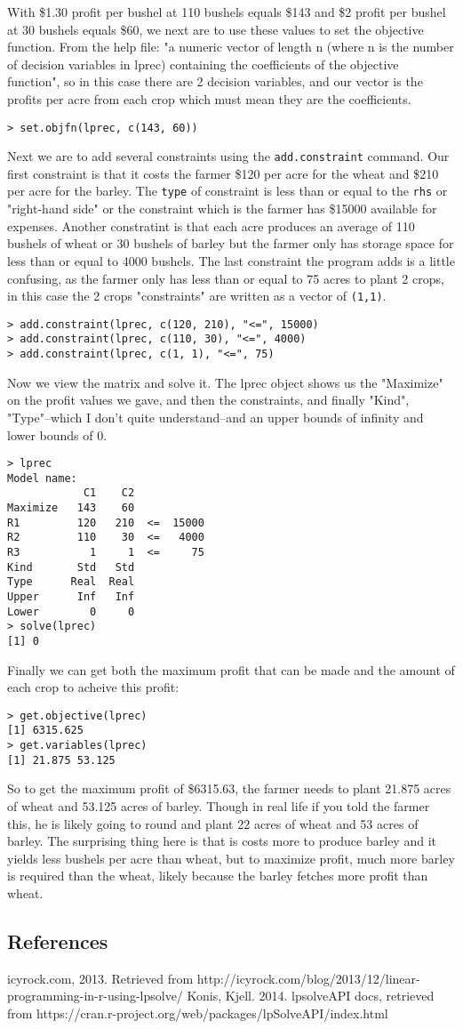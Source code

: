 \documentclass[10pt]{article}
\begin{document}
With \$1.30 profit per bushel at 110 bushels equals \$143 and \$2 profit per bushel at 30 bushels equals \$60, we next are to use these values to set the objective function. From the help file: "a numeric vector of length n (where n is the number of decision variables in lprec) containing the coefficients of the objective function", so in this case there are 2 decision variables, and our vector is the profits per acre from each crop which must mean they are the coefficients. 
\begin{verbatim}
> set.objfn(lprec, c(143, 60))
\end{verbatim}
Next we are to add several constraints using the \verb|add.constraint| command. Our first constraint is that it costs the farmer \$120 per acre for the wheat and \$210 per acre for the barley. The \verb|type| of constraint is less than or equal to the \verb|rhs| or "right-hand side" or the constraint which is the farmer has \$15000 available for expenses. Another constratint is that each acre produces an average of 110 bushels of wheat or 30 bushels of barley but the farmer only has storage space for less than or equal to 4000 bushels. The last constraint the program adds is a little confusing, as the farmer only has less than or equal to 75 acres to plant 2 crops, in this case the 2 crops "constraints" are written as a vector of \verb|(1,1)|.
\begin{verbatim}
> add.constraint(lprec, c(120, 210), "<=", 15000)
> add.constraint(lprec, c(110, 30), "<=", 4000)
> add.constraint(lprec, c(1, 1), "<=", 75)
\end{verbatim}
Now we view the matrix and solve it. The lprec object shows us the "Maximize" on the profit values we gave, and then the constraints, and finally "Kind", "Type"--which I don't quite understand--and an upper bounds of infinity and lower bounds of 0.
\begin{verbatim}
> lprec
Model name: 
            C1    C2           
Maximize   143    60           
R1         120   210  <=  15000
R2         110    30  <=   4000
R3           1     1  <=     75
Kind       Std   Std           
Type      Real  Real           
Upper      Inf   Inf           
Lower        0     0 
> solve(lprec)
[1] 0
\end{verbatim}
Finally we can get both the maximum profit that can be made and the amount of each crop to acheive this profit:
\begin{verbatim}
> get.objective(lprec)
[1] 6315.625
> get.variables(lprec)
[1] 21.875 53.125
\end{verbatim}
So to get the maximum profit of \$6315.63, the farmer needs to plant 21.875 acres of wheat and 53.125 acres of barley. Though in real life if you told the farmer this, he is likely going to round and  plant 22 acres of wheat and 53 acres of barley. The surprising thing here is that is costs more to produce barley and it yields less bushels per acre than wheat, but to maximize profit, much more barley is required than the wheat, likely because the barley fetches more profit than wheat. 
\subsection*{References}
icyrock.com, 2013. Retrieved from http://icyrock.com/blog/2013/12/linear-programming-in-r-using-lpsolve/
Konis, Kjell. 2014. lpsolveAPI docs, retrieved from https://cran.r-project.org/web/packages/lpSolveAPI/index.html
\end{document}
